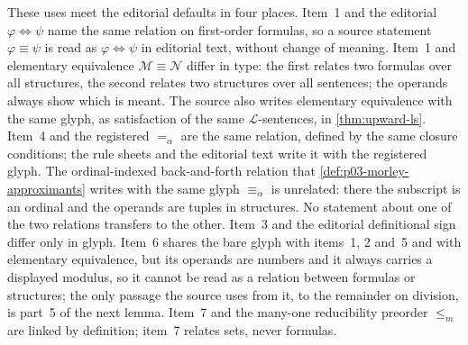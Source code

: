 These uses meet the editorial defaults in four places.  Item~1 and the
editorial \(\varphi\Leftrightarrow\psi\) name the same relation on
first-order formulas, so a source statement \(\varphi\equiv\psi\) is read
as \(\varphi\Leftrightarrow\psi\) in editorial text, without change of
meaning.  Item~1 and elementary equivalence \(\mathcal M\equiv\mathcal N\)
differ in type: the first relates two formulas over all structures, the
second relates two structures over all sentences; the operands always show
which is meant.  The source also writes elementary equivalence with the same
glyph, as satisfaction of the same \(\mathcal L\)-sentences, in
\cref{thm:upward-ls}.  Item~4 and the registered \(=_\alpha\) are the same
relation, defined by the same closure conditions; the rule sheets and the
editorial text write it with the registered glyph.  The
ordinal-indexed back-and-forth relation that \cref{def:p03-morley-approximants}
writes with the same glyph \(\equiv_\alpha\) is unrelated: there the
subscript is an ordinal and the operands are tuples in structures.  No
statement about one of the two relations transfers to the other.  Item~3 and
the editorial definitional sign differ only in glyph.  Item~6 shares the
bare glyph with items~1, 2 and~5 and with elementary equivalence, but its
operands are numbers and it always carries a displayed modulus, so it cannot
be read as a relation between formulas or structures; the only passage the
source uses from it, to the remainder on division, is part~5 of the next
lemma.  Item~7 and the many-one reducibility preorder \(\leq_m\) are linked by
definition; item~7 relates sets, never formulas.

